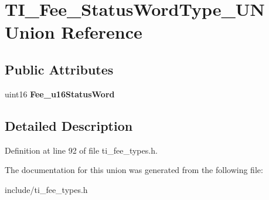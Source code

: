 \hypertarget{unionTI__Fee__StatusWordType__UN}{}\section{T\+I\+\_\+\+Fee\+\_\+\+Status\+Word\+Type\+\_\+\+UN Union Reference}
\label{unionTI__Fee__StatusWordType__UN}
\subsection*{Public Attributes}
\begin{DoxyCompactItemize}
\item 
\mbox{\label{unionTI__Fee__StatusWordType__UN_af11d76c7f2bee65c99f96d2fb466976d}} 
uint16 {\bfseries Fee\+\_\+u16\+Status\+Word}
\end{DoxyCompactItemize}


\subsection{Detailed Description}


Definition at line 92 of file ti\+\_\+fee\+\_\+types.\+h.



The documentation for this union was generated from the following file\+:\begin{DoxyCompactItemize}
\item 
include/ti\+\_\+fee\+\_\+types.\+h\end{DoxyCompactItemize}
